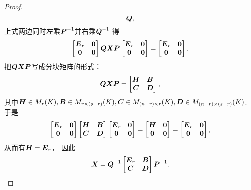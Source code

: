 \begin{theorem}[广义逆存在定理]
\begin{proof}
\begin{equation*}
	\boldsymbol{Q},
\end{equation*}
上式两边同时左乘\(\boldsymbol{P}^{-1}\)并右乘\(\boldsymbol{Q}^{-1}\)
得\begin{equation*}
	\begin{bmatrix}
		\boldsymbol{E}_r & \boldsymbol0 \\
		\boldsymbol0 & \boldsymbol0
	\end{bmatrix}
	\boldsymbol{Q} \boldsymbol{X} \boldsymbol{P}
	\begin{bmatrix}
		\boldsymbol{E}_r & \boldsymbol0 \\
		\boldsymbol0 & \boldsymbol0
	\end{bmatrix}
	=
	\begin{bmatrix}
		\boldsymbol{E}_r & \boldsymbol0 \\
		\boldsymbol0 & \boldsymbol0
	\end{bmatrix}.
\end{equation*}
把\(\boldsymbol{Q} \boldsymbol{X} \boldsymbol{P}\)写成分块矩阵的形式：\begin{equation*}
	\boldsymbol{Q} \boldsymbol{X} \boldsymbol{P}
	= \begin{bmatrix}
		\boldsymbol{H} & \boldsymbol{B} \\
		\boldsymbol{C} & \boldsymbol{D}
	\end{bmatrix},
\end{equation*}
其中\(
	\boldsymbol{H} \in M_r(K),
	\boldsymbol{B} \in M_{r \times (s-r)}(K),
	\boldsymbol{C} \in M_{(n-r) \times r}(K),
	\boldsymbol{D} \in M_{(n-r) \times (s-r)}(K)
\).
于是\begin{equation*}
	\begin{bmatrix}
		\boldsymbol{E}_r & \boldsymbol0 \\
		\boldsymbol0 & \boldsymbol0
	\end{bmatrix}
	\begin{bmatrix}
		\boldsymbol{H} & \boldsymbol{B} \\
		\boldsymbol{C} & \boldsymbol{D}
	\end{bmatrix}
	\begin{bmatrix}
		\boldsymbol{E}_r & \boldsymbol0 \\
		\boldsymbol0 & \boldsymbol0
	\end{bmatrix}
	= \begin{bmatrix}
		\boldsymbol{H} & \boldsymbol0 \\
		\boldsymbol0 & \boldsymbol0
	\end{bmatrix}
	= \begin{bmatrix}
		\boldsymbol{E}_r & \boldsymbol0 \\
		\boldsymbol0 & \boldsymbol0
	\end{bmatrix},
\end{equation*}
从而有\(\boldsymbol{H} = \boldsymbol{E}_r\)，
因此\begin{equation*}
	\boldsymbol{X}
	= \boldsymbol{Q}^{-1}
	\begin{bmatrix}
		\boldsymbol{E}_r & \boldsymbol{B} \\
		\boldsymbol{C} & \boldsymbol{D}
	\end{bmatrix}
	\boldsymbol{P}^{-1}.
\end{equation*}


\end{proof}
\end{theorem}

